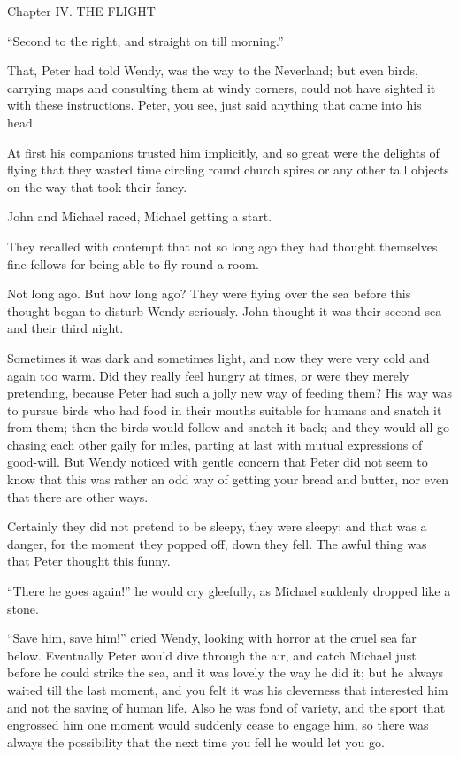 Chapter IV.
THE FLIGHT


``Second to the right, and straight on till morning.''

That, Peter had told Wendy, was the way to the Neverland; but even
birds, carrying maps and consulting them at windy corners, could not
have sighted it with these instructions. Peter, you see, just said
anything that came into his head.

At first his companions trusted him implicitly, and so great were the
delights of flying that they wasted time circling round church spires
or any other tall objects on the way that took their fancy.

John and Michael raced, Michael getting a start.

They recalled with contempt that not so long ago they had thought
themselves fine fellows for being able to fly round a room.

Not long ago. But how long ago? They were flying over the sea before
this thought began to disturb Wendy seriously. John thought it was
their second sea and their third night.

Sometimes it was dark and sometimes light, and now they were very cold
and again too warm. Did they really feel hungry at times, or were they
merely pretending, because Peter had such a jolly new way of feeding
them? His way was to pursue birds who had food in their mouths suitable
for humans and snatch it from them; then the birds would follow and
snatch it back; and they would all go chasing each other gaily for
miles, parting at last with mutual expressions of good-will. But Wendy
noticed with gentle concern that Peter did not seem to know that this
was rather an odd way of getting your bread and butter, nor even that
there are other ways.

Certainly they did not pretend to be sleepy, they were sleepy; and that
was a danger, for the moment they popped off, down they fell. The awful
thing was that Peter thought this funny.

``There he goes again!'' he would cry gleefully, as Michael suddenly
dropped like a stone.

``Save him, save him!'' cried Wendy, looking with horror at the cruel sea
far below. Eventually Peter would dive through the air, and catch
Michael just before he could strike the sea, and it was lovely the way
he did it; but he always waited till the last moment, and you felt it
was his cleverness that interested him and not the saving of human
life. Also he was fond of variety, and the sport that engrossed him one
moment would suddenly cease to engage him, so there was always the
possibility that the next time you fell he would let you go.

